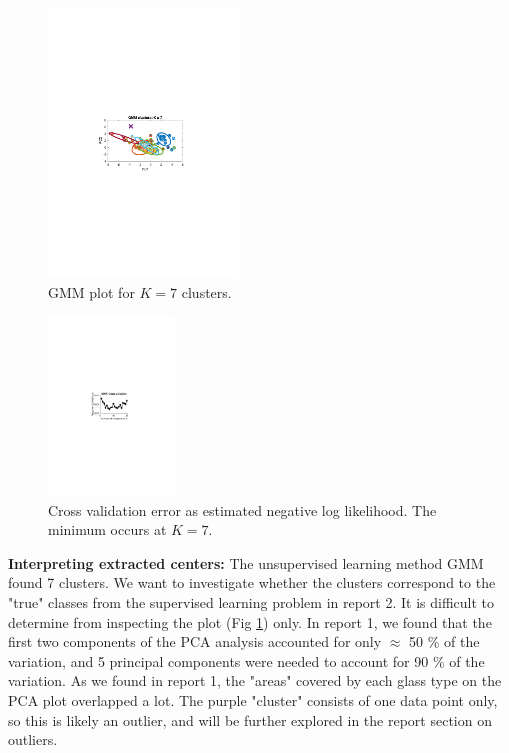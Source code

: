\begin{multicols}{2}

\begin{figure}[H]
    \centering
    \includegraphics[width=0.45\textwidth]{fig/GMM_clusters_7_twofig.pdf}
    \caption{GMM plot for $K = 7$ clusters.}
    \label{fig:GMM_clusters_7}
\end{figure}

\begin{figure}[H]
    \centering
    \includegraphics[width=0.30\textwidth]{fig/GMM_number_of_components_reg_twofig.pdf}
    \caption{Cross validation error as estimated negative log likelihood. The minimum occurs at $K = 7$.}
    \label{fig:GMM_number_of_components}
\end{figure}
\end{multicols}


\textbf{Interpreting extracted centers:} The unsupervised learning method GMM found 7 clusters. We want to investigate whether the clusters correspond to the "true" classes from the supervised learning problem in report 2. It is difficult to determine from inspecting the plot (Fig \ref{fig:GMM_clusters_7}) only. In report 1, we found that the first two components of the PCA analysis accounted for only $\approx$ 50 \% of the variation, and 5 principal components were needed to account for 90 \% of the variation. As we found in report 1, the "areas" covered by each glass type on the PCA plot overlapped a lot. The purple "cluster" consists of one data point only, so this is likely an outlier, and will be further explored in the report section on outliers.

